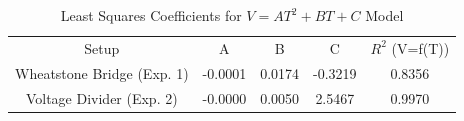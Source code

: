 \begin{table}[H]
\centering
\caption{Least Squares Coefficients for $V = AT^2 + BT + C$ Model}
\label{table:lsq_coefficients_table}
\begin{tabular}{ccccc}

                     Setup &       A &      B &       C & $R^2$ (V=f(T)) \\

Wheatstone Bridge (Exp. 1) & -0.0001 & 0.0174 & -0.3219 &         0.8356 \\
  Voltage Divider (Exp. 2) & -0.0000 & 0.0050 &  2.5467 &         0.9970 \\

\end{tabular}
\end{table}
